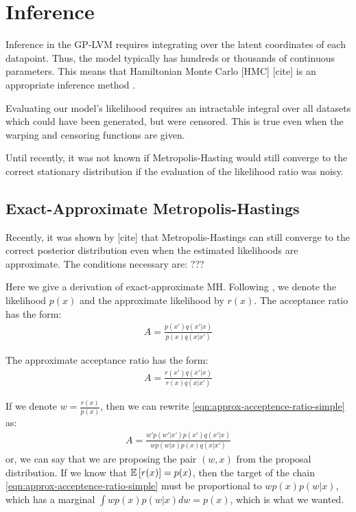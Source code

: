\documentclass{article}
\begin{document}
\section{Inference}

Inference in the GP-LVM requires integrating over the latent coordinates of each datapoint.  Thus, the model typically has hundreds or thousands of continuous parameters.  This means that Hamiltonian Monte Carlo [HMC] [cite] is an appropriate inference method \cite{IwaDuvGha2012warped}.  

Evaluating our model's likelihood requires an intractable integral over all datasets which could have been generated, but were censored.  This is true even when the warping and censoring functions are given.

Until recently, it was not known if Metropolis-Hasting would still converge to the correct stationary distribution if the evaluation of the likelihood ratio was noisy.

\subsection{Exact-Approximate Metropolis-Hastings}

Recently, it was shown by [cite] that Metropolis-Hastings can still converge to the correct posterior distribution even when the estimated likelihoods are approximate.  The conditions necessary are: ???

Here we give a derivation of exact-approximate MH.  Following \cite{eamcblogWilk10}, we denote the likelihood $p(x)$ and the approximate likelihood by $r(x)$.
%
The acceptance ratio has the form:
%
\begin{align}
A = \frac{p(x') q(x' | x )}{p(x) q(x | x' )}
\end{align}

The approximate acceptance ratio has the form:
%
\begin{align}
A = \frac{r(x') q(x' | x )}{r(x) q(x | x' )}
\label{eqn:approx-acceptence-ratio-simple}
\end{align}

If we denote $w = \frac{r(x)}{p(x)}$, then we can rewrite \eqref{eqn:approx-acceptence-ratio-simple} as:
%
\begin{align}
A = \frac{w' p(w' | x' ) p(x') q(x' | x )}{w p(w | x ) p(x) q(x | x' )}
\label{eqn:approx-acceptence-ratio-complex}
\end{align}
%
or, we can say that we are proposing the pair $(w,x)$ from the proposal distribution.
%
%
If we know that $\mathbb{E}\left[ r(x) \right] = p(x)$, then the target of the chain \eqref{eqn:approx-acceptence-ratio-simple} must be proportional to $w p(x) p(w|x)$, which has a marginal $ \int w p(x) p(w|x) dw = p(x)$, which is what we wanted.
\end{document}
